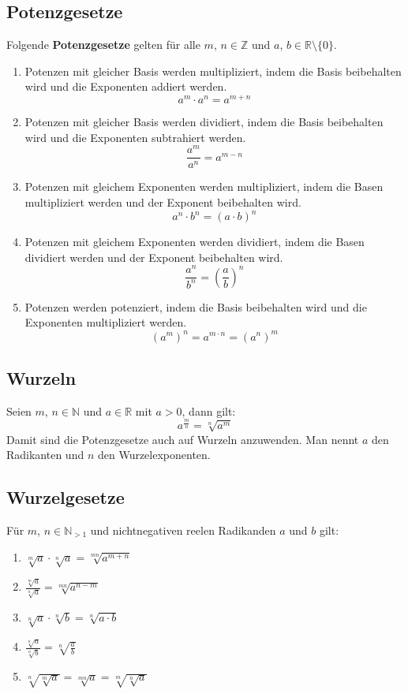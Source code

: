 \subsection{Potenzgesetze}
Folgende \textbf{Potenzgesetze} gelten für alle $ m $, $ n \in \mathbb{Z} $ und $ a$, $ b \in \mathbb{R}\setminus\{0\} $.
\begin{enumerate}
	\item %
		Potenzen mit gleicher Basis werden multipliziert, indem die Basis beibehalten wird und die Exponenten addiert werden.
		\[a^m \cdot a^n = a^{m+n}\]
	\item %
		Potenzen mit gleicher Basis werden dividiert, indem die Basis beibehalten wird und die Exponenten subtrahiert werden.	
		\[\frac{a^m}{a^n} = a^{m-n}\]
	\item %
		Potenzen mit gleichem Exponenten werden multipliziert, indem die Basen multipliziert werden und der Exponent beibehalten wird.
		\[a^n \cdot b^n = (a \cdot b)^n\]
	\item %
		Potenzen mit gleichem Exponenten werden dividiert, indem die Basen dividiert werden und der Exponent beibehalten wird.
		\[\frac{a^n}{b^n} = \left(\frac{a}{b}\right)^n\]
	\item %
		Potenzen werden potenziert, indem die Basis beibehalten wird und die Exponenten multipliziert werden.
		\[(a^m)^n = a^{m \cdot n} = (a^n)^m \]
\end{enumerate}
\subsection{Wurzeln}
Seien $ m $, $ n \in \mathbb{N} $ und $ a \in \mathbb{R} $ mit $ a>0 $, dann gilt:
	\[a^{\frac{m}{n}} = \sqrt[n]{a^m}\]
Damit sind die Potenzgesetze auch auf Wurzeln anzuwenden.
\noindent Man nennt $a$ den Radikanten und $n$ den Wurzelexponenten.
\subsection{Wurzelgesetze}
Für $m$, $n \in \mathbb{N}_{>1}$ und nichtnegativen reelen Radikanden $a$ und $b$ gilt:
\begin{enumerate}
	\item $\sqrt[m]{a}\cdot\sqrt[n]{a} = \sqrt[mn]{a^{m+n}}$
	\item $\frac{\sqrt[m]{a}}{\sqrt[n]{a}} = \sqrt[mn]{a^{n-m}}$
	\item $\sqrt[n]{a}\cdot\sqrt[n]{b} = \sqrt[n]{a\cdot b}$
	\item $\frac{\sqrt[n]{a}}{\sqrt[n]{b}} = \sqrt[n]{\frac{a}{b}}$
	\item $\sqrt[n]{\sqrt[m]{a}} = \sqrt[mn]{a} = \sqrt[m]{\sqrt[n]{a}}$
\end{enumerate} 
